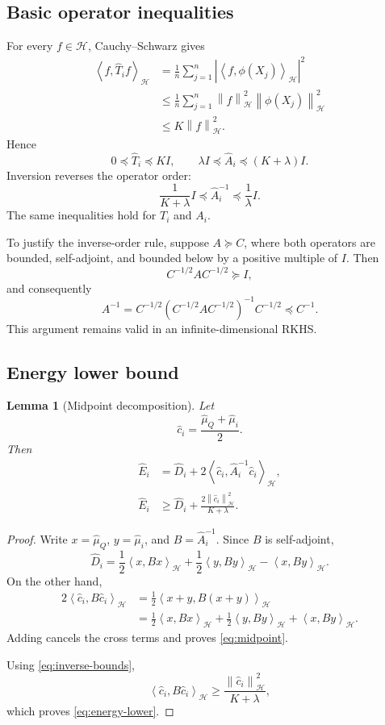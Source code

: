 \documentclass[11pt]{article}
\newcommand{\HH}{\mathcal H}
\newcommand{\inner}[2]{\left\langle #1,#2\right\rangle_{\HH}}
\newcommand{\norm}[1]{\left\lVert #1\right\rVert_{\HH}}
\newtheorem{lemma}{Lemma}
\begin{document}
\subsection{Basic operator inequalities}

For every $f\in\HH$, Cauchy--Schwarz gives
\[
\begin{aligned}
\inner{f}{\widehat T_i f}
&=\frac1n\sum_{j=1}^n
|\inner{f}{\phi(X_j)}|^2\\
&\le\frac1n\sum_{j=1}^n
\norm{f}^2\norm{\phi(X_j)}^2\\
&\le K\norm{f}^2.
\end{aligned}
\]
Hence
\[
0\preceq\widehat T_i\preceq KI,
\qquad
\lambda I\preceq\widehat A_i\preceq(K+\lambda)I.
\]
Inversion reverses the operator order:
\begin{equation}
\frac1{K+\lambda}I
\preceq\widehat A_i^{-1}
\preceq\frac1\lambda I.
\label{eq:inverse-bounds}
\end{equation}
The same inequalities hold for $T_i$ and $A_i$.

To justify the inverse-order rule, suppose $A\succeq C$,
where both operators are bounded, self-adjoint, and bounded
below by a positive multiple of $I$. Then
\[
C^{-1/2}AC^{-1/2}\succeq I,
\]
and consequently
\[
A^{-1}
=
C^{-1/2}(C^{-1/2}AC^{-1/2})^{-1}C^{-1/2}
\preceq C^{-1}.
\]
This argument remains valid in an infinite-dimensional RKHS.

\subsection{Energy lower bound}

\begin{lemma}[Midpoint decomposition]
\label{lem:midpoint}
Let
\[
\widehat c_i=\frac{\widehat\mu_Q+\widehat\mu_i}{2}.
\]
Then
\begin{align}
\widehat E_i
&=
\widehat D_i
+2\inner{\widehat c_i}
{\widehat A_i^{-1}\widehat c_i},
\label{eq:midpoint}\\
\widehat E_i
&\ge
\widehat D_i+\frac{2\norm{\widehat c_i}^2}{K+\lambda}.
\label{eq:energy-lower}
\end{align}
\end{lemma}

\begin{proof}
Write $x=\widehat\mu_Q$, $y=\widehat\mu_i$, and
$B=\widehat A_i^{-1}$.
Since $B$ is self-adjoint,
\[
\widehat D_i
=
\frac12\inner{x}{Bx}
+\frac12\inner{y}{By}
-\inner{x}{By}.
\]
On the other hand,
\[
\begin{aligned}
2\inner{\widehat c_i}{B\widehat c_i}
&=\frac12\inner{x+y}{B(x+y)}\\
&=\frac12\inner{x}{Bx}
+\frac12\inner{y}{By}
+\inner{x}{By}.
\end{aligned}
\]
Adding cancels the cross terms and proves
\eqref{eq:midpoint}.

Using \eqref{eq:inverse-bounds},
\[
\inner{\widehat c_i}{B\widehat c_i}
\ge\frac{\norm{\widehat c_i}^2}{K+\lambda},
\]
which proves \eqref{eq:energy-lower}.
\end{proof}
\end{document}

